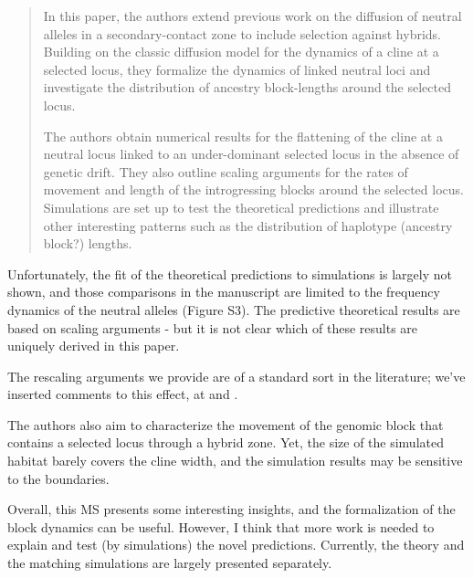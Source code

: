 \begin{quote}
    In this paper, the authors extend previous work on the diffusion of neutral alleles in a secondary-contact zone to include selection against hybrids. Building on the classic diffusion model for the dynamics of a cline at a selected locus, they formalize the dynamics of linked neutral loci and investigate the distribution of ancestry block-lengths around the selected locus.

    The authors obtain numerical results for the flattening of the cline at a neutral locus linked to an under-dominant selected locus in the absence of genetic drift. They also outline scaling arguments for the rates of movement and length of the introgressing blocks around the selected locus. Simulations are set up to test the theoretical predictions and illustrate other interesting patterns such as the distribution of haplotype (ancestry block?) lengths.
\end{quote}

\begin{point}{}
    Unfortunately, the fit of the theoretical predictions to simulations is largely not shown, and those comparisons in the manuscript are limited to the frequency dynamics of the neutral alleles (Figure S3). The predictive theoretical results are based on scaling arguments - but it is not clear which of these results are uniquely derived in this paper.
\end{point}

\reply
{}

The rescaling arguments we provide  are of a standard sort in the literature;
we've inserted comments to this effect, at  and .


\begin{point}{}
    The authors also aim to characterize the movement of the genomic block that contains a selected locus through a hybrid zone. Yet, the size of the simulated habitat barely covers the cline width, and the simulation results may be sensitive to the boundaries.

Overall, this MS presents some interesting insights, and the formalization of the block dynamics can be useful. However, I think that more work is needed to explain and test (by simulations) the novel predictions. Currently, the theory and the matching simulations are largely presented separately.
\end{point}

